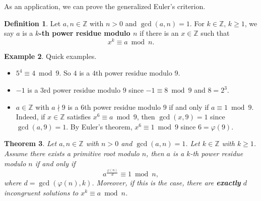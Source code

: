 \documentclass{amsbook}
\theoremstyle{plain}
\newtheorem{theorem}{Theorem}[chapter] %
\theoremstyle{definition}
\newtheorem{definition}[theorem]{Definition}
\newtheorem{example}[theorem]{Example}
\theoremstyle{remark}
\numberwithin{equation}{chapter}
\numberwithin{figure}{chapter}
\newcommand{\Z}{\mathbb{Z}}
\begin{document}
As an application, we can prove the generalized Euler's criterion.
\begin{definition}
  Let $a, n \in \Z$  with $n > 0$ and $\gcd (a, n) = 1$. For $k \in \Z$, $k \geqslant 1$, we say $a$ is a \textbf{$k$-th power residue modulo $n$} if there is an $x \in \Z$ such that
  \[
    x^k \equiv a \bmod n.
  \]
\end{definition}
\begin{example}\label{ex:kth_pow}
  Quick examples.
  \begin{itemize}
  \item $5^4 \equiv 4 \bmod 9$. So $4$ is a $4$th power residue modulo 9.
  \item $-1$ is a $3$rd power residue modulo $9$ since $-1 \equiv 8 \bmod 9$ and $8 = 2^3$.
  \item $a \in \Z$ with $a \nmid 9$ is a $6$th power residue modulo $9$ if and only if $a \equiv 1 \bmod 9$. Indeed, if $x \in \Z$ satisfies $x^6 \equiv a \bmod 9$, then $\gcd (x, 9) = 1$ since $\gcd (a, 9) = 1$. By Euler's theorem, $x^6 \equiv 1 \bmod 9$ since $6 = \varphi (9)$.
  \end{itemize}
\end{example}
\begin{theorem}\label{thm:generalized_euler_criterion}
  Let $a, n \in \Z$ with $n > 0$ and $\gcd (a, n) = 1$. Let $k \in \Z$ with $k \geqslant 1$. Assume there exists a primitive root modulo $n$, then $a$ is a $k$-th power residue modulo $n$ if and only if
  \[
    a^{\frac{\varphi(n)}d} \equiv 1 \bmod n,
  \]
  where $d  = \gcd (\varphi (n), k)$. Moreover, if this is the case, there are \textbf{exactly} $d$ incongruent solutions to $x^k \equiv a \bmod n$. 
\end{theorem}
\end{document}
